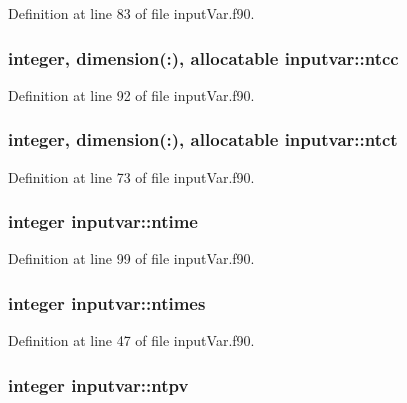 Definition at line 83 of file input\-Var.\-f90.

\hypertarget{classinputvar_aaf3cc67ce289abacf61f20f5fdcfc3f6}{
\subsubsection[{ntcc}]{\setlength{\rightskip}{0pt plus 5cm}integer, dimension(\-:), allocatable inputvar\-::ntcc}}\label{classinputvar_aaf3cc67ce289abacf61f20f5fdcfc3f6}


Definition at line 92 of file input\-Var.\-f90.

\hypertarget{classinputvar_ad5c9bbca95851da9fa84642ea414e6be}{
\subsubsection[{ntct}]{\setlength{\rightskip}{0pt plus 5cm}integer, dimension(\-:), allocatable inputvar\-::ntct}}\label{classinputvar_ad5c9bbca95851da9fa84642ea414e6be}


Definition at line 73 of file input\-Var.\-f90.

\hypertarget{classinputvar_a30d8dd7bcf1952df019939f8ad23b6e2}{
\subsubsection[{ntime}]{\setlength{\rightskip}{0pt plus 5cm}integer inputvar\-::ntime}}\label{classinputvar_a30d8dd7bcf1952df019939f8ad23b6e2}


Definition at line 99 of file input\-Var.\-f90.

\hypertarget{classinputvar_a98d384e0347fb055110c18572dbdb522}{
\subsubsection[{ntimes}]{\setlength{\rightskip}{0pt plus 5cm}integer inputvar\-::ntimes}}\label{classinputvar_a98d384e0347fb055110c18572dbdb522}


Definition at line 47 of file input\-Var.\-f90.

\hypertarget{classinputvar_a7aec6c8c1bc131db50a1a7e65f8b0977}{
\subsubsection[{ntpv}]{\setlength{\rightskip}{0pt plus 5cm}integer inputvar\-::ntpv}}\label{classinputvar_a7aec6c8c1bc131db50a1a7e65f8b0977}


